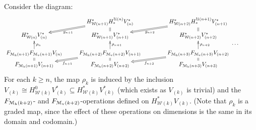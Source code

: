 \documentclass[11pt]{amsart}
\theoremstyle{plain}
\theoremstyle{definition}
\newcommand{\calW}{\mathcal{W}}
\newcommand{\calU}{\mathcal{U}}
\newcommand{\calM}{\mathcal{M}}
\newcommand{\calMv}{\mathcal{M}_\textup{v}}
\newcommand{\calMh}{\mathcal{M}_\textup{h}}
\theoremstyle{plain}
\begin{document}
\begin{Calculations of HWn for n nonzero}
Consider the diagram:
\[\xymatrix@R=1.5mm{
&
H^*_{\calW({n+1})}H_*^{\calU(n)}V^*_{(n)}\ar@{=>}[dl]^-{g_{n+1}}\ar@{=}[d]&
H^*_{\calW({n+2})}H_*^{\calU({n+1})}V^*_{({n+1})}\ar@{=>}[dl]^-{g_{n+2}}\ar@{=}[d]&
\\
 H^*_{\calW(n)}V^*_{(n)}
&H^*_{\calW({n+1})}V^*_{({n+1})}
&H^*_{\calW({n+2})}V^*_{({n+2})}
\\
&&\makebox[5cm][r]{\,$\smash{\cdots }$}
\\
 F_{\calM_{\textup{h}}({n+1})}F_{\calM_{\textup{v}}({n+1})}V_{(n)}\ar[uu]_-{\rho_n}\ar@{=}[d]
&F_{\calM_{\textup{h}}({n+2})}F_{\calM_{\textup{v}}({n+2})}V_{({n+1})}\ar[uu]_-{\rho_{n+1}}\ar@{=}[d]\ar@{=>}[ld]^-{f_{n+1}}
&F_{\calM_{\textup{h}}({n+3})}F_{\calM_{\textup{v}}({n+3})}V_{({n+2})}\ar[uu]_-{\rho_{n+2}}\ar@{=}[d]\ar@{=>}[ld]^-{f_{n+2}}
\\
 F_{\calMh({n+1})}V_{({n+1})}
&F_{\calMh({n+2})}V_{({n+2})}
&F_{\calMh({n+3})}V_{({n+3})}
}\]
For each $k\geq n$, the map $\rho_k$ is induced by the inclusion $V_{(k)}\cong H^{0}_{\calW(k)}V^*_{(k)}\subseteq H^*_{\calW(k)}V^*_{(k)}$ (which exists as $V_{(k)}$ is trivial) and the $F_{\calMh(k+2)}$- and $F_{\calMv(k+2)}$-operations defined on $H^*_{\calW(k)}V_{(k)}$. (Note that $\rho_{k}$ is a graded map, since the effect of these operations on dimensions is the same in its domain and codomain.)


\end{Calculations of HWn for n nonzero}
\end{document}
